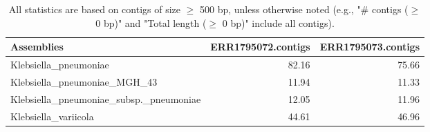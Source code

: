 \documentclass[12pt,a4paper]{article}
\begin{document}
\begin{table}[ht]
\begin{center}
\caption{All statistics are based on contigs of size $\geq$ 500 bp, unless otherwise noted (e.g., "\# contigs ($\geq$ 0 bp)" and "Total length ($\geq$ 0 bp)" include all contigs).}
\begin{tabular}{|l*{2}{|r}|}
\hline
Assemblies & ERR1795072.contigs & ERR1795073.contigs \\ \hline
Klebsiella\_pneumoniae & 82.16 & 75.66 \\ \hline
Klebsiella\_pneumoniae\_MGH\_43 & 11.94 & 11.33 \\ \hline
Klebsiella\_pneumoniae\_subsp.\_pneumoniae & 12.05 & 11.96 \\ \hline
Klebsiella\_variicola & 44.61 & 46.96 \\ \hline
\end{tabular}
\end{center}
\end{table}
\end{document}
